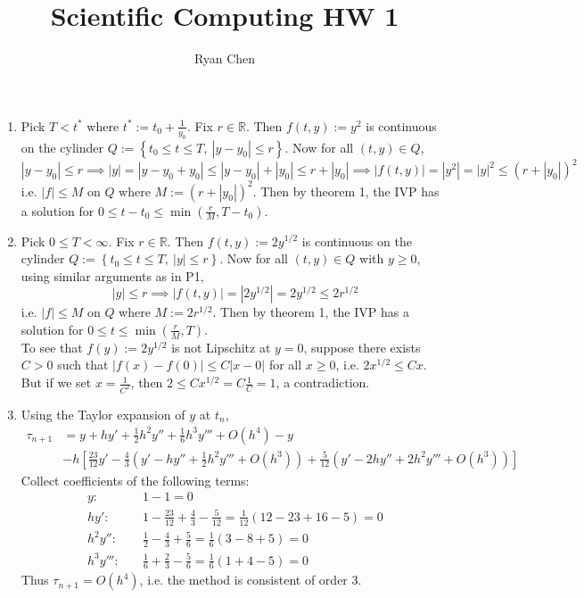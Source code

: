 \documentclass{article}
\title{Scientific Computing HW 1}
\author{Ryan Chen}
\def\mbb#1{\mathbb{#1}}
\def\bR{\mbb{R}}
\newcommand{\br}[1]{\left(#1\right)}
\newcommand{\sbr}[1]{\left[#1\right]}
\newcommand{\brc}[1]{\left\{#1\right\}}
\newcommand{\imp}{\implies}
\begin{document}
\maketitle



\begin{enumerate}
	
	
	
\item Pick $T<t^*$ where $t^*:=t_0+\frac{1}{y_0}$. Fix $r\in\bR$. Then $f(t,y):=y^2$ is continuous on the cylinder $Q:=\brc{t_0\le t\le T,~|y-y_0|\le r}$. Now for all $(t,y)\in Q$,
$$|y-y_0|\le r
\imp |y| = |y-y_0+y_0|
\le |y-y_0|+|y_0|
\le r+|y_0|
\imp |f(t,y)| = |y^2| = |y|^2 \le (r+|y_0|)^2$$
i.e. $|f|\le M$ on $Q$ where $M:=(r+|y_0|)^2$. Then by theorem 1, the IVP has a solution for $0\le t-t_0\le \min(\tfrac rM,T-t_0)$.



\item Pick $0\le T<\infty$. Fix $r\in\bR$. Then $f(t,y):=2y^{1/2}$ is continuous on the cylinder $Q:=\brc{t_0\le t\le T,~|y|\le r}$. Now for all $(t,y)\in Q$ with $y\ge0$, using similar arguments as in P1,
$$|y|\le r
\imp |f(t,y)| = |2y^{1/2}| = 2y^{1/2} \le 2r^{1/2}$$
i.e. $|f|\le M$ on $Q$ where $M:=2r^{1/2}$. Then by theorem 1, the IVP has a solution for $0\le t\le \min(\frac rM,T)$.\\

To see that $f(y):=2y^{1/2}$ is not Lipschitz at $y=0$, suppose there exists $C>0$ such that $|f(x)-f(0)|\le C|x-0|$ for all $x\ge0$, i.e. $2x^{1/2}\le Cx$. But if we set $x=\frac{1}{C^2}$, then $2\le Cx^{1/2}=C\frac1C=1$, a contradiction.



\item Using the Taylor expansion of $y$ at $t_n$,
\begin{align*}
	\tau_{n+1} &= y + hy' + \frac12h^2y'' + \frac16h^3y''' + O(h^4) - y \\
	& - h\sbr{\frac{23}{12}y' - \frac43\br{y' - hy'' + \frac12h^2y''' + O(h^3)} + \frac{5}{12}\br{y' - 2hy'' + 2h^2y''' + O(h^3)}}
\end{align*}
Collect coefficients of the following terms:
\begin{align*}
	y: &\quad 1 - 1 = 0 \\
	hy': &\quad 1 - \frac{23}{12} + \frac43 - \frac{5}{12} = \frac{1}{12}(12-23+16-5) = 0 \\
	h^2y'': &\quad \frac12 - \frac43 + \frac56 = \frac16(3-8+5) = 0 \\
	h^3y''': &\quad \frac16 + \frac23 - \frac56 = \frac16(1+4-5) = 0 
\end{align*}
Thus $\tau_{n+1}=O(h^4)$, i.e. the method is consistent of order 3.




\end{enumerate}
\end{document}
